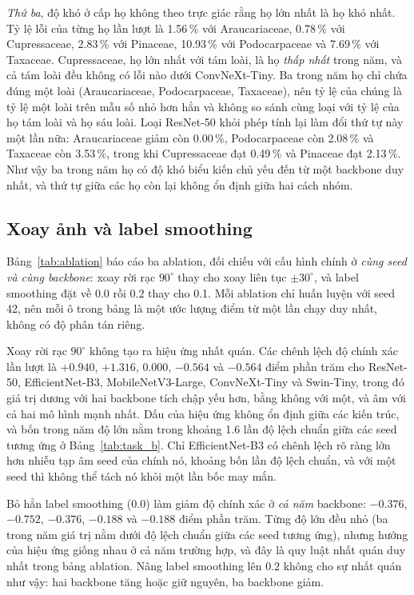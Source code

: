 \textit{Thứ ba}, độ khó ở cấp họ không theo trực giác rằng họ lớn nhất là họ
khó nhất. Tỷ lệ lỗi của từng họ lần lượt là 1.56\,\% với Araucariaceae,
0.78\,\% với Cupressaceae, 2.83\,\% với Pinaceae, 10.93\,\% với
Podocarpaceae và 7.69\,\% với Taxaceae. Cupressaceae, họ lớn nhất với tám
loài, là họ \emph{thấp nhất} trong năm, và cả tám loài đều không có lỗi nào
dưới ConvNeXt-Tiny. Ba trong năm họ chỉ chứa đúng một loài (Araucariaceae,
Podocarpaceae, Taxaceae), nên tỷ lệ của chúng là tỷ lệ một loài trên mẫu số nhỏ
hơn hẳn và không so sánh cùng loại với tỷ lệ của họ tám loài và họ sáu loài.
Loại ResNet-50 khỏi phép tính lại làm đổi thứ tự này một lần nữa: Araucariaceae
giảm còn 0.00\,\%, Podocarpaceae còn 2.08\,\% và Taxaceae còn 3.53\,\%,
trong khi Cupressaceae đạt 0.49\,\% và Pinaceae đạt 2.13\,\%. Như vậy ba
trong năm họ có độ khó biểu kiến chủ yếu đến từ một backbone duy nhất, và thứ
tự giữa các họ còn lại không ổn định giữa hai cách nhóm.

\subsection{Xoay ảnh và label smoothing}
\label{vi:sec:results:ablation}

Bảng~\ref{tab:ablation} báo cáo ba ablation, đối chiếu với cấu hình chính ở
\emph{cùng seed và cùng backbone}: xoay rời rạc $90^\circ$ thay cho xoay liên
tục $\pm30^\circ$, và label smoothing đặt về 0.0 rồi 0.2 thay cho 0.1. Mỗi
ablation chỉ huấn luyện với seed 42, nên mỗi ô trong bảng là một ước lượng
điểm từ một lần chạy duy nhất, không có độ phân tán riêng.



Xoay rời rạc $90^\circ$ không tạo ra hiệu ứng nhất quán. Các chênh lệch độ
chính xác lần lượt là $+0.940$, $+1.316$, $0.000$, $-0.564$ và $-0.564$ điểm
phần trăm cho ResNet-50, EfficientNet-B3, MobileNetV3-Large, ConvNeXt-Tiny và
Swin-Tiny, trong đó giá trị dương với hai backbone tích chập yếu hơn, bằng không với một, và
âm với cả hai mô hình mạnh nhất. Dấu của hiệu ứng không ổn định giữa các kiến
trúc, và bốn trong năm độ lớn nằm trong khoảng 1.6 lần độ lệch chuẩn giữa các
seed tương ứng ở Bảng~\ref{tab:task_b}. Chỉ EfficientNet-B3 có chênh lệch rõ
ràng lớn hơn nhiễu tạp âm seed của chính nó, khoảng bốn lần độ lệch chuẩn, và
với một seed thì không thể tách nó khỏi một lần bốc may mắn.

Bỏ hẳn label smoothing ($0.0$) làm giảm độ chính xác ở \emph{cả năm} backbone:
$-0.376$, $-0.752$, $-0.376$, $-0.188$ và $-0.188$ điểm phần trăm. Từng độ lớn
đều nhỏ (ba trong năm giá trị nằm dưới độ lệch chuẩn giữa các seed tương ứng),
nhưng hướng của hiệu ứng giống nhau ở cả năm trường hợp, và đây là quy luật
nhất quán duy nhất trong bảng ablation. Nâng label smoothing lên $0.2$ không
cho sự nhất quán như vậy: hai backbone tăng hoặc giữ nguyên, ba backbone giảm.

